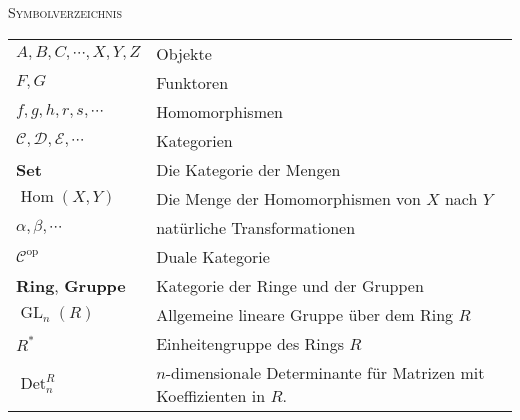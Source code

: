 \documentclass[a4paper]{amsart}
\theoremstyle{definition}
\DeclareMathOperator{\Det}{Det}
\DeclareMathOperator{\Hom}{Hom}
\DeclareMathOperator{\GL}{GL}
\begin{document}
\begin{large}
    \centerline{\textsc{Symbolverzeichnis}}
\end{large}
\bigskip

\renewcommand*{\arraystretch}{1}

\begin{tabular}{ll}
    $A, B, C, \cdots, X, Y, Z$          & Objekte\\
    $F,G$                               & Funktoren\\
    $f, g, h, r, s, \cdots$             & Homomorphismen\\
    $\mathcal C, \mathcal D, \mathcal E, \cdots$ & Kategorien\\
    \textbf{Set}                        & Die Kategorie der Mengen\\
    $\Hom( X, Y)$                       & Die Menge der Homomorphismen von $X$ nach $Y$\\
    $\alpha, \beta, \cdots$             & natürliche Transformationen\\
    $\mathcal C ^{\text{op}}$           & Duale Kategorie\\
    \textbf{Ring}, \textbf{Gruppe}      & Kategorie der Ringe und der Gruppen\\
    $\GL_n(R)$                          & Allgemeine lineare Gruppe über dem Ring $R$\\
    $R^*$                               & Einheitengruppe des Rings $R$\\
    $\Det_n^R$                          & $n$-dimensionale Determinante für Matrizen mit Koeffizienten in $R$. 
    
\end{tabular}
\end{document}
